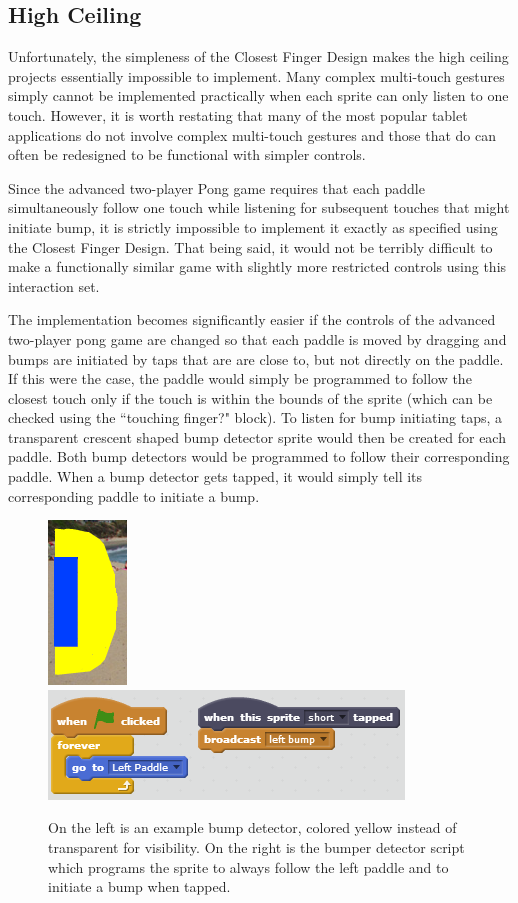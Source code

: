\subsection{High Ceiling}

Unfortunately, the simpleness of the Closest Finger Design makes the high ceiling projects essentially impossible to implement. Many complex multi-touch gestures simply cannot be implemented practically when each sprite can only listen to one touch. However, it is worth restating that many of the most popular tablet applications do not involve complex multi-touch gestures and those that do can often be redesigned to be functional with simpler controls.

Since the advanced two-player Pong game requires that each paddle simultaneously follow one touch while listening for subsequent touches that might initiate bump, it is strictly impossible to implement it exactly as specified using the Closest Finger Design. That being said, it would not be terribly difficult to make a functionally similar game with slightly more restricted controls using this interaction set. 

The implementation becomes significantly easier if the controls of the advanced two-player pong game are changed so that each paddle is moved by dragging and bumps are initiated by taps that are are close to, but not directly on the paddle. If this were the case, the paddle would simply be programmed to follow the closest touch only if the touch is within the bounds of the sprite (which can be checked using the ``touching finger?" block). To listen for bump initiating taps, a transparent crescent shaped bump detector sprite would then be created for each paddle. Both bump detectors would be programmed to follow their corresponding paddle. When a bump detector gets tapped, it would simply tell its corresponding paddle to initiate a bump.

\begin{figure}
\centering
\includegraphics{images/LeftBumper.PNG}
\includegraphics{images/BumperScript.PNG}
\caption{On the left is an example bump detector, colored yellow instead of transparent for visibility. On the right is the bumper detector script which programs the sprite to always follow the left paddle and to initiate a bump when tapped.}
\end{figure}

